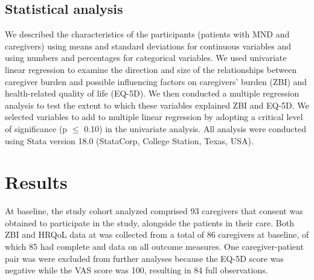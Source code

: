\documentclass[12pt]{article}
\begin{document}
\subsection{Statistical analysis}
We described the characteristics of the participants (patients with MND and caregivers) using means and standard deviations for continuous variables and using numbers and percentages for categorical variables. We used univariate linear regression to examine the direction and size of the relationships between caregiver burden and possible influencing factors on  caregivers’ burden (ZBI) and health-related quality of life (EQ-5D). We then conducted a multiple regression analysis to test the extent to which these variables explained ZBI and EQ-5D. We selected variables to add to multiple linear regression by adopting a critical level of significance (p $\leq$ 0.10) in the univariate analysis.
All analysis were conducted using Stata version 18.0 (StataCorp, College Station, Texas, USA).

\section{Results}
At baseline, the study cohort analyzed comprised 93 caregivers that consent was obtained to participate in the study, alongside the patients in their care. Both ZBI and HRQoL data at was collected from a total of 86 caregivers at baseline, of which 85 had complete and data on all outcome measures. One caregiver-patient pair was were excluded from further analyses because the EQ-5D score was negative while the VAS score was 100, resulting in 84 full observations. %
\end{document}
